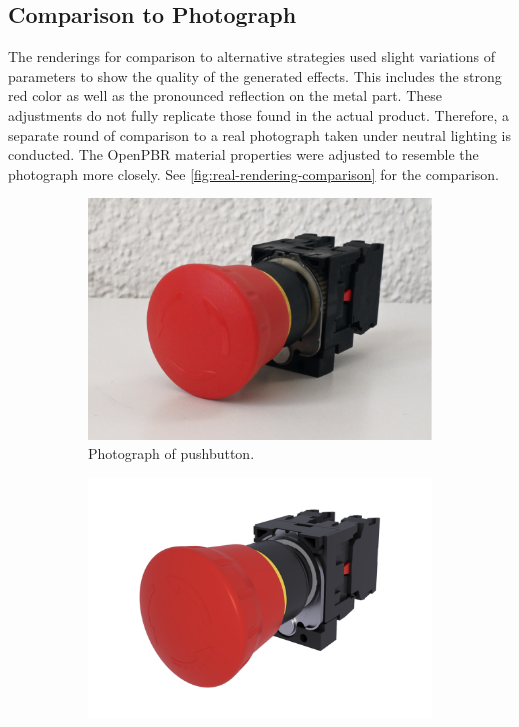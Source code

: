 \newpage
\subsection*{Comparison to Photograph}

The renderings for comparison to alternative strategies used slight variations of parameters to show the quality of the generated effects. This includes the strong red color as well as the pronounced reflection on the metal part. These adjustments do not fully replicate those found in the actual product. Therefore, a separate round of comparison to a real photograph taken under neutral lighting is conducted. The \gls{OpenPBR} material properties were adjusted to resemble the photograph more closely. See \autoref{fig:real-rendering-comparison} for the comparison.

\begin{figure}[H]
  \centering
  \hspace*{0.2cm}
  \begin{subfigure}[t]{0.45\textwidth}
    \includegraphics[width=\textwidth]{resources/comparison-real-image.png}
    \caption{Photograph of pushbutton.}
    \label{fig:real-photo}
  \end{subfigure}
  \hfill
  \begin{subfigure}[t]{0.45\textwidth}
    \includegraphics[width=\textwidth]{resources/comparison-real-strahl-rendering.png}

\end{subfigure}
\end{figure}
